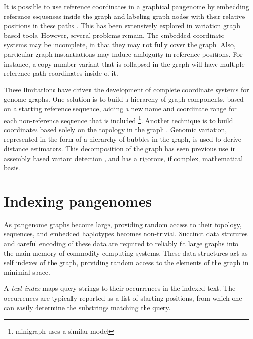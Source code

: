 It is possible to use reference coordinates in a graphical pangenome by embedding reference sequences inside the graph and labeling graph nodes with their relative positions in these paths \cite{Garrison_2018,Garrison_2019}.
This has been extensively explored in variation graph based tools.
However, several problems remain.
The embedded coordinate systems may be incomplete, in that they may not fully cover the graph.
Also, particular graph instantiations may induce ambiguity in reference positions.
For instance, a copy number variant that is collapsed in the graph will have multiple reference path coordinates inside of it.

These limitations have driven the development of complete coordinate systems for genome graphs.
One solution is to build a hierarchy of graph components, based on a starting reference sequence, adding a new name and coordinate range for each non-reference sequence that is included \cite{Rand_2017}\footnote{minigraph uses a similar model}.
Another technique is to build coordinates based solely on the topology in the graph \cite{paten2018superbubbles}.
Genomic variation, represented in the form of a hierarchy of bubbles in the graph, is used to derive distance estimators.
This decomposition of the graph has seen previous use in assembly based variant detection \cite{Iqbal_2012, Onodera_2013}, and has a rigorous, if complex, mathematical basis.


\section{Indexing pangenomes} %

As pangenome graphs become large, providing random access to their topology, sequences, and embedded haplotypes becomes non-trivial.
Succinct data strctures and careful encoding of these data are required to reliably fit large graphs into the main memory of commodity computing systems.
These data structures act as self indexes of the graph, providing random access to the elements of the graph in minimial space.

A \emph{text index} maps query strings to their occurrences in the indexed text.
The occurrences are typically reported as a list of starting positions, from which one can easily determine the substrings matching the query.

